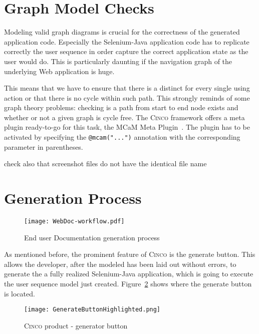 \section{Graph Model Checks}\label{sec:modCheck}

Modeling valid graph diagrams is crucial for the correctness of the generated application code. Especially the Selenium-Java application code has to replicate correctly the user sequence in order capture the correct application state as the user would do. This is particularly daunting if the navigation graph of the underlying Web application is huge.

This means that we have to ensure that there is a distinct for every single using action or that there is no cycle within such path. This strongly reminds of some graph theory problems: checking is a path from start to end node exists and whether or not a given graph is cycle free. The \textsc{Cinco} framework offers a meta plugin ready-to-go for this task, the MCaM Meta Plugin~\cite{gitlabcinco}. The plugin has to be activated by specifying the \lstinline{@mcam("...")} annotation with the corresponding parameter in parentheses.

check also that screenshot files do not have the identical file name
\section{Generation Process}\label{sec:GenProcess}

\begin{figure}[h]
    \centering
    \texttt{[image: WebDoc-workflow.pdf]}
    \caption{End user Documentation generation process}
    \label{fig:WebDocWorkflow}
\end{figure}

As mentioned before, the prominent feature of \textsc{Cinco} is the generate button. This allows the developer, after the modeled has been laid out without errors, to generate the a fully realized Selenium-Java application, which is going to execute the user sequence model just created. Figure~\ref{fig:genButton} shows where the generate button is located.

\begin{figure}[H]
    \centering
    \texttt{[image: GenerateButtonHighlighted.png]}
    \caption{\textsc{Cinco} product - generator button}
    \label{fig:genButton}
\end{figure}
